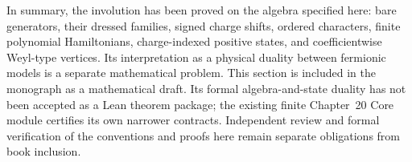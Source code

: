 In summary, the involution has been proved on the algebra specified
here: bare generators, their dressed families, signed charge shifts,
ordered characters, finite polynomial Hamiltonians, charge-indexed
positive states, and coefficientwise Weyl-type vertices.  Its
interpretation as a physical duality between fermionic models is a
separate mathematical problem.  This section is included in the monograph as a
mathematical draft.  Its formal algebra-and-state duality has not been accepted
as a Lean theorem package; the existing finite Chapter~20 Core module certifies
its own narrower contracts.  Independent review and formal verification of the
conventions and proofs here remain separate obligations from book inclusion.
